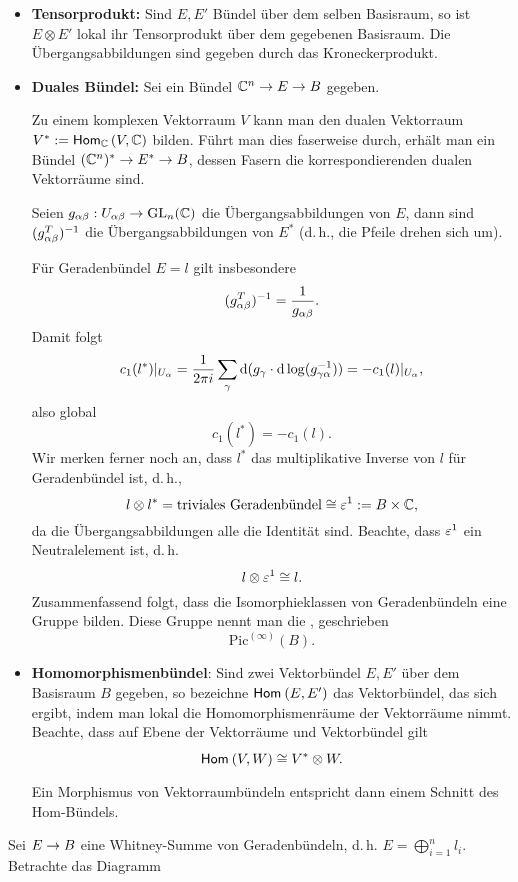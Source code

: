 \begin{itemize}
	\item \textbf{Tensorprodukt:} Sind $E,E'$ Bündel über dem selben Basisraum, so ist $E \otimes E'$ lokal ihr Tensorprodukt über dem gegebenen Basisraum. Die Übergangsabbildungen sind gegeben durch das Kroneckerprodukt.
	\item \textbf{Duales Bündel:} Sei ein Bündel $\mathbb{C}^n \overset{}{\rightarrow} E \overset{}{\rightarrow} B$ gegeben.
	
	Zu einem komplexen Vektorraum $V$ kann man den dualen Vektorraum $V^* := \textsf{Hom}_{\mathbb{C}}\left(V, \mathbb{C}\right)$ bilden. Führt man dies faserweise durch, erhält man ein Bündel $(\mathbb{C}^n)^* \overset{}{\rightarrow} E^* \overset{}{\rightarrow} B$, dessen Fasern die korrespondierenden dualen Vektorräume sind.
	
	Seien $g_{\alpha \beta} : U_{\alpha \beta} \overset{}{\rightarrow} \mathrm{GL}_n(\mathbb{C})$ die Übergangsabbildungen von $E$, dann sind $(g_{\alpha \beta}^T)^{-1}$ die Übergangsabbildungen von $E^*$ (d.\,h., die Pfeile drehen sich um).

	Für Geradenbündel $E = l$ gilt insbesondere
	\[ (g_{\alpha \beta}^T)^{-1} = \frac{1}{g_{\alpha \beta}}. \]
	Damit folgt
	\[ c_1(l^*)|_{U_\alpha} = 
	\frac{1}{2\pi i}
	\sum_\gamma \text{d} (g_\gamma \cdot \text{d} \log (g^{-1}_{\gamma \alpha}))
	= -c_1(l)|_{U_\alpha},
	 \]
	 also global
	 \[ c_1(l^*) = -c_1(l). \]
	 Wir merken ferner noch an, dass $l^*$ das multiplikative Inverse von $l$ für Geradenbündel ist, d.\,h.,
	 \[ l\otimes l^* = \text{triviales Geradenbündel} \overset{}{\cong} \varepsilon^1 := B\times \mathbb{C}, \]
	 da die Übergangsabbildungen alle die Identität sind. Beachte, dass $\varepsilon^1$ ein Neutralelement ist, d.\,h.
	 \[ l \otimes \varepsilon^1 \overset{}{\cong} l. \]
	 Zusammenfassend folgt, dass die Isomorphieklassen von Geradenbündeln eine Gruppe bilden. Diese Gruppe nennt man die , geschrieben
	 \[ \mathrm{Pic}^{(\infty)}(B). \]
	 \item \textbf{Homomorphismenbündel}: Sind zwei Vektorbündel $E, E'$ über dem Basisraum $B$ gegeben, so bezeichne $\textsf{Hom}_{}\left(E, E'\right)$ das Vektorbündel, das sich ergibt, indem man lokal die Homomorphismenräume der Vektorräume nimmt. Beachte, dass auf Ebene der Vektorräume und Vektorbündel gilt
	 \[ \textsf{Hom}_{}\left(V, W\right) \overset{}{\cong} V^* \otimes W. \]
	 
	 Ein Morphismus von Vektorraumbündeln entspricht dann einem Schnitt des Hom-Bündels.
\end{itemize}

Sei $E \overset{}{\rightarrow} B$ eine Whitney-Summe von Geradenbündeln, d.\,h. $E = \bigoplus_{i = 1}^n l_i$. Betrachte das Diagramm
\begin{center}
\end{center}

